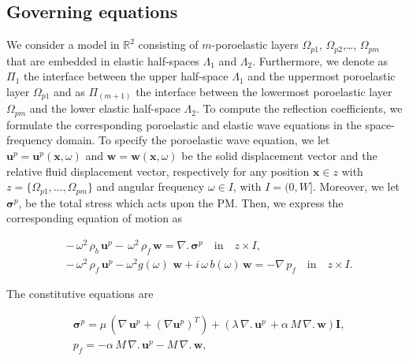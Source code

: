 \documentclass[draft]{agujournal2019}
\begin{document}
\subsection{Governing equations}
We consider a model in $\mathbb R^2$ consisting of 
$m$-poroelastic layers  $\Omega_{p1}$,  $\Omega_{p2}$,\dots, $\Omega_{pm}$ that are embedded in elastic half-spaces $\Lambda_1$ and $\Lambda_2$. Furthermore, we denote as $\Pi_1$  the interface between the upper half-space $\Lambda_1$ and the uppermost poroelastic layer $\Omega_{p1}$ and as $\Pi_{(m+1)}$ the interface between the lowermost poroelastic layer $\Omega_{pm}$ and the lower elastic half-space $\Lambda_2$. To compute the  reflection coefficients, we formulate the corresponding poroelastic and elastic wave equations in the space-frequency domain. To specify the poroelastic wave equation,  we let $\bm{u}^p =\bm{u}^p( \bm{x}, \omega)$ and $\bm{w} =\bm{w}( \bm{x}, \omega)$  be the solid displacement vector and the relative fluid displacement vector, respectively for any position $\bm{x} \in z$ with $z=\{\Omega_{p1},\dots,\Omega_{pm}\}$  and angular frequency $\omega \in I$, with $I =(0,W]$. Moreover, we let $\bm {\sigma}^p$, be the total stress which acts upon the PM. Then, we express the corresponding equation of motion as
\begin{linenomath*}
\begin{equation}\label{Eq.a1}
\begin{split}
& -\,\omega^2  \, \rho_b  \, \bm{u}^p -  \,\omega^2 \, \rho_f \, \bm{w}= \nabla . \, \bm{\sigma}^p \quad  \textrm{in} \quad z \times I, \\
& -\,\omega^2  \, \rho_f \, \bm{u}^p - \omega^2 g(\omega) \, \, \bm{w} + i \, \omega \, b(\omega) \, \bm{w} = - \nabla \, p_f \quad  \textrm{in} \quad z \times I.
\end{split}
\end{equation}
\end{linenomath*}
The constitutive equations are
\begin{linenomath*}
\begin{equation}\label{Eq.a2}
\begin{split}
& \bm{\sigma}^p = \mu \,  \left( \nabla \,\bm{u}^p + ({\nabla  \bm{u}^p})^T  \right) +  \left( \lambda \, \nabla . \, \bm{u}^p\, + \alpha \,M \, \nabla . \, \bm{w} \right) \bm{I}, \\
&p_f=- \alpha \, M \, \nabla . \, \bm{u}^p - M \, \nabla . \, \bm{w},  \end{split}
\end{equation}
\end{linenomath*}
\end{document}

